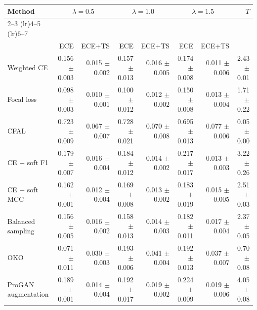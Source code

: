 \begin{tabular}{lrrrrrrr}
\toprule
Method & \multicolumn{2}{c}{$\lambda=0.5$} & \multicolumn{2}{c}{$\lambda=1.0$} & \multicolumn{2}{c}{$\lambda=1.5$} & $T$ \\ \cmidrule(lr){2--3} \cmidrule(lr){4--5} \cmidrule(lr){6--7}\\
 & ECE & ECE+TS & ECE & ECE+TS & ECE & ECE+TS & \\
\midrule
Weighted CE & \num{0.156} $\pm$ \num{0.003} & \num{0.015} $\pm$ \num{0.002} & \num{0.157} $\pm$ \num{0.013} & \num{0.016} $\pm$ \num{0.005} & \num{0.174} $\pm$ \num{0.008} & \num{0.011} $\pm$ \num{0.006} & \num{2.43} $\pm$ \num{0.01}\\
Focal loss & \num{0.098} $\pm$ \num{0.003} & \num{0.010} $\pm$ \num{0.001} & \num{0.100} $\pm$ \num{0.012} & \num{0.012} $\pm$ \num{0.002} & \num{0.150} $\pm$ \num{0.008} & \num{0.013} $\pm$ \num{0.004} & \num{1.71} $\pm$ \num{0.22}\\
CFAL & \num{0.723} $\pm$ \num{0.009} & \num{0.067} $\pm$ \num{0.007} & \num{0.728} $\pm$ \num{0.021} & \num{0.070} $\pm$ \num{0.008} & \num{0.695} $\pm$ \num{0.013} & \num{0.077} $\pm$ \num{0.006} & \num{0.05} $\pm$ \num{0.00}\\
CE + soft F1 & \num{0.179} $\pm$ \num{0.007} & \num{0.016} $\pm$ \num{0.004} & \num{0.184} $\pm$ \num{0.012} & \num{0.014} $\pm$ \num{0.002} & \num{0.217} $\pm$ \num{0.017} & \num{0.013} $\pm$ \num{0.003} & \num{3.22} $\pm$ \num{0.26}\\
CE + soft MCC & \num{0.162} $\pm$ \num{0.001} & \num{0.012} $\pm$ \num{0.004} & \num{0.169} $\pm$ \num{0.008} & \num{0.013} $\pm$ \num{0.002} & \num{0.183} $\pm$ \num{0.019} & \num{0.015} $\pm$ \num{0.005} & \num{2.51} $\pm$ \num{0.03}\\
Balanced sampling & \num{0.156} $\pm$ \num{0.005} & \num{0.016} $\pm$ \num{0.002} & \num{0.158} $\pm$ \num{0.013} & \num{0.014} $\pm$ \num{0.003} & \num{0.182} $\pm$ \num{0.011} & \num{0.017} $\pm$ \num{0.004} & \num{2.37} $\pm$ \num{0.05}\\
OKO & \num{0.071} $\pm$ \num{0.011} & \num{0.030} $\pm$ \num{0.003} & \num{0.193} $\pm$ \num{0.006} & \num{0.041} $\pm$ \num{0.004} & \num{0.192} $\pm$ \num{0.013} & \num{0.037} $\pm$ \num{0.007} & \num{0.70} $\pm$ \num{0.08}\\
ProGAN augmentation & \num{0.189} $\pm$ \num{0.001} & \num{0.014} $\pm$ \num{0.004} & \num{0.192} $\pm$ \num{0.017} & \num{0.019} $\pm$ \num{0.002} & \num{0.224} $\pm$ \num{0.009} & \num{0.019} $\pm$ \num{0.006} & \num{4.05} $\pm$ \num{0.08}\\
\bottomrule
\end{tabular}
